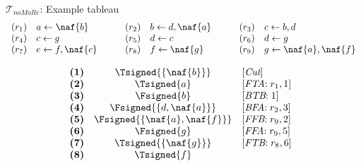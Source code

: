 \begin{frame}{$\mathcal{T}_{\textit{noMoRe}}$: Example tableau}
\small
\[
\begin{array}{llllllllllll}
(r_1)  &  a \leftarrow \naf{b}                  & & &
(r_2)  &  b \leftarrow d, \naf{a}               & & &
(r_3)  &  c \leftarrow b, d                            \\
(r_4)  &  c \leftarrow g                               & & &
(r_5)  &  d \leftarrow c                               & & &
(r_6)  &  d \leftarrow g                               \\
(r_7)  &  e \leftarrow f, \naf{c}               & & &
(r_8)  &  f \leftarrow \naf{g}                  & & &
(r_9)  &  g \leftarrow \naf{a}, \naf{f}
\end{array}
\]
\begin{center}
\hspace*{-15pt}
\begin{minipage}[t]{16cm}
\tiny
\begin{minipage}[t]{4.5cm}
\[
\hspace{-0.2cm}
\begin{array}{lcl}
\textbf{(1)}                                       &
  \Tsigned{\{\naf{b}\}}                     &
  [\textit{Cut}]                                   \\
\textbf{(2)}                                       &
  \Tsigned{a}                                      &
  [\textit{FTA}{:}\; r_1, \text{1}]                \\
\textbf{(3)}                                       &
  \Fsigned{b}                                      &
  [\textit{BTB}{:}\; \text{1}]                     \\
\textbf{(4)}                                       &
  \Fsigned{\{d,\naf{a}\}}                   &
  [\textit{BFA}{:}\;r_2, \text{3}]                 \\
\textbf{(5)}                                       &
  \Fsigned{\{\naf{a},\naf{f}\}}      &
  [\textit{FFB}{:}\;r_9, \text{2}]                 \\
\textbf{(6)}                                       &
  \Fsigned{g}                                      &
  [\textit{FFA}{:}\;r_9, \text{5}]                 \\
\textbf{(7)}                                       &
  \Tsigned{\{\naf{g}\}}                     &
  [\textit{FTB}{:}\;r_8, \text{6}]                 \\
\textbf{(8)}                                       &
  \Tsigned{f}                                      &

\end{array}\]
\end{minipage}
\end{minipage}
\end{center}
\end{frame}
